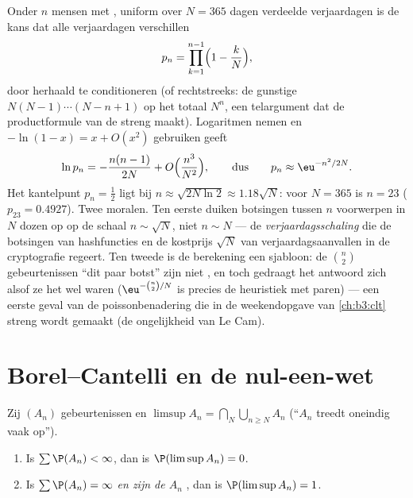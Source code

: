 \begin{example}
\label{ex:b3:probability:birthday}
Onder $n$ mensen met , uniform over $N = 365$ dagen
verdeelde verjaardagen is de kans dat alle verjaardagen
verschillen
\[
p_n = \prod_{k=1}^{n-1}\Bigl(1 - \frac kN\Bigr),
\]
door herhaald te conditioneren (of rechtstreeks: de gunstige
$N(N-1)\cdots(N - n + 1)$ op het totaal $N^n$, een telargument
dat de productformule van de  streng maakt).
Logaritmen nemen en $-\ln(1 - x) = x + O(x^2)$ gebruiken geeft
\[
\ln p_n = -\frac{n(n-1)}{2N} +
O\Bigl(\frac{n^3}{N^2}\Bigr),
\qquad\text{dus}\qquad
p_n \approx \eu^{-n^2/2N} .
\]
Het kantelpunt $p_n = \frac12$ ligt bij $n \approx
\sqrt{2N\ln2} \approx 1.18\sqrt N$: voor $N = 365$ is $n = 23$
($p_{23} = 0.4927$). Twee moralen. Ten eerste duiken botsingen
tussen $n$ voorwerpen in $N$ dozen op op de schaal $n \sim \sqrt
N$, niet $n \sim N$ --- de \emph{verjaardagsschaling} die de
botsingen van hashfuncties en de kostprijs $\sqrt N$ van
verjaardagsaanvallen in de cryptografie regeert. Ten tweede is de
berekening een sjabloon: de $\binom n2$ gebeurtenissen ``dit paar
botst'' zijn niet , en toch gedraagt het antwoord
zich alsof ze het wel waren ($\eu^{-\binom n2/N}$ is precies de
heuristiek met  paren) --- een eerste geval van de
poissonbenadering die in de weekendopgave van \cref{ch:b3:clt}
streng wordt gemaakt (de ongelijkheid van Le Cam).
\end{example}

\section{Borel--Cantelli en de nul-een-wet}

\begin{theorem}
\label{thm:b3:probability:borelcantelli}
Zij $(A_n)$ gebeurtenissen en $\limsup A_n = \bigcap_N
\bigcup_{n\geq N}A_n$ (``$A_n$ treedt oneindig vaak
op'').
\begin{enumerate}
  \item Is $\sum\P(A_n) < \infty$, dan is $\P(\limsup A_n) = 0$.
  \item Is $\sum\P(A_n) = \infty$ \emph{en zijn de $A_n$
        }, dan is $\P(\limsup A_n) = 1$.
\end{enumerate}
\end{theorem}


